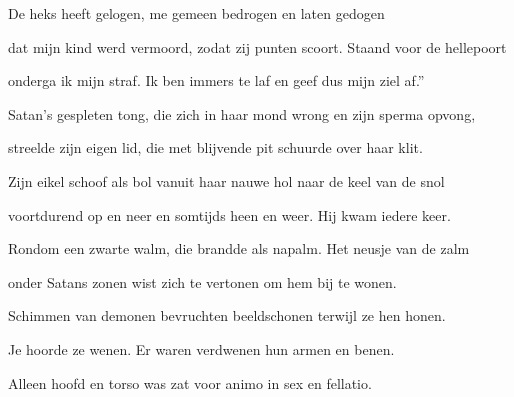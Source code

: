 De heks heeft gelogen,
me gemeen bedrogen
en laten gedogen

dat mijn kind werd vermoord,
zodat zij punten scoort.
Staand voor de hellepoort

onderga ik mijn straf.
Ik ben immers te laf
en geef dus mijn ziel af.”

Satan’s gespleten tong,
die zich in haar mond wrong
en zijn sperma opvong,

streelde zijn eigen lid,
die met blijvende pit
schuurde over haar klit.

Zijn eikel schoof als bol
vanuit haar nauwe hol
naar de keel van de snol

voortdurend op en neer
en somtijds heen en weer.
Hij kwam iedere keer.

Rondom een zwarte walm,
die brandde als napalm.
Het neusje van de zalm

onder Satans zonen
wist zich te vertonen
om hem bij te wonen.

Schimmen van demonen
bevruchten beeldschonen
terwijl ze hen honen.

Je hoorde ze wenen.
Er waren verdwenen
hun armen en benen.

Alleen hoofd en torso
was zat voor animo
in sex en fellatio.
